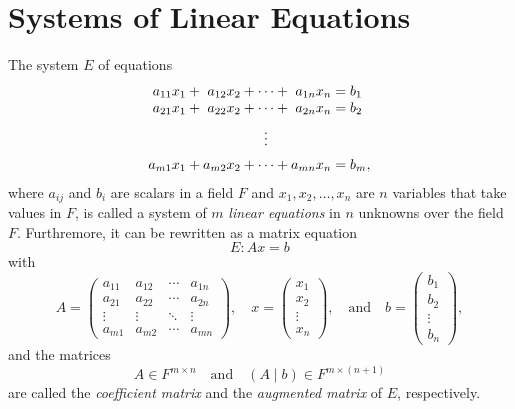 \section{Systems of Linear Equations}
\begin{definition}
  \label{def:system-linear-equations}
  The system $E$ of equations
  \begin{equation*}
    \setlength\arraycolsep{0pt}
    \begin{array}{rcrcccrcl}
      a_{11}x_1 &\pl& a_{12}x_2 &\pl& \cdots &\pl& a_{1n}x_n &\eq& b_1 \\
      a_{21}x_1 &\pl& a_{22}x_2 &\pl& \cdots &\pl& a_{2n}x_n &\eq& b_2 \\[.5em]
                &   &           &   & \vdots &   &           &   &     \\[.5em]
      a_{m1}x_1 &\pl& a_{m2}x_2 &\pl& \cdots &\pl& a_{mn}x_n &\eq& b_m,
    \end{array}
  \end{equation*}
  where $a_{ij}$ and $b_i$ are scalars in a field $F$ and
  $x_1, x_2, \dots, x_n$ are $n$ variables that take values in $F$,
  is called a system of $m$ \emph{linear equations} in $n$ unknowns
  over the field $F$.
  Furthremore, it can be rewritten as a matrix equation
  \begin{equation*}
    E: Ax = b
  \end{equation*}
  with
  \begin{equation*}
    A =
    \begin{pmatrix}
      a_{11} & a_{12} & \cdots & a_{1n} \\
      a_{21} & a_{22} & \cdots & a_{2n} \\
      \vdots & \vdots & \ddots & \vdots \\
      a_{m1} & a_{m2} & \cdots & a_{mn}
    \end{pmatrix},
    \quad
    x = \begin{pmatrix} x_1 \\ x_2 \\ \vdots \\ x_n \end{pmatrix},
    \quad \text{and} \quad
    b = \begin{pmatrix} b_1 \\ b_2 \\ \vdots \\ b_n \end{pmatrix},
  \end{equation*}
  and the matrices
  \begin{equation*}
    A \in F^{m \times n}
    \quad \text{and} \quad
    (A \mid b) \in F^{m \times (n+1)}
  \end{equation*}
  are called the \emph{coefficient matrix} and the \emph{augmented matrix} of
  $E$, respectively.
\end{definition}

